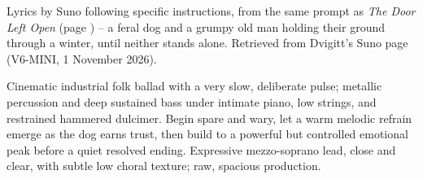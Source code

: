 
\label{sec:two-hard-hearts}
\begin{notes}
Lyrics by Suno following specific instructions, from the same prompt as \emph{The Door Left Open} (page \pageref{sec:the-door-left-open}) -- a feral dog and a grumpy old man holding their ground through a winter, until neither stands alone. Retrieved from Dvigitt's Suno page (V6-MINI, 1 November 2026).
\end{notes}
\begin{style}
Cinematic industrial folk ballad with a very slow, deliberate pulse; metallic percussion and deep sustained bass under intimate piano, low strings, and restrained hammered dulcimer. Begin spare and wary, let a warm melodic refrain emerge as the dog earns trust, then build to a powerful but controlled emotional peak before a quiet resolved ending. Expressive mezzo-soprano lead, close and clear, with subtle low choral texture; raw, spacious production.
\end{style}
